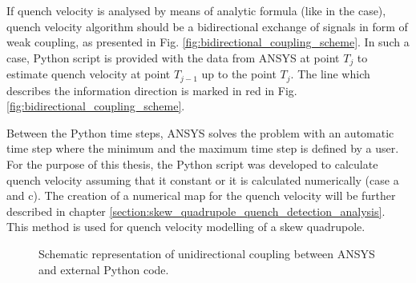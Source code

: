 If quench velocity is analysed by means of analytic formula (like in the  case), quench velocity algorithm should be a bidirectional exchange of signals in form of weak coupling, as presented in Fig. \ref{fig:bidirectional_coupling_scheme}. In such a case, Python script is provided with the data from ANSYS at point $T_j$ to estimate quench velocity at point $T_{j-1}$ up to the point $T_j$. The line which describes the information direction is marked in red in Fig. \ref{fig:bidirectional_coupling_scheme}.

Between the Python time steps, ANSYS solves the problem with an automatic time step where the minimum and the maximum time step is defined by a user. For the purpose of this thesis, the Python script was developed to calculate quench velocity assuming that it constant or it is calculated numerically (case a and c). The creation of a numerical map for the quench velocity will be further described in chapter \ref{section:skew_quadrupole_quench_detection_analysis}. This method is used for quench velocity modelling of a skew quadrupole.

\begin{figure}[H]
\centering
{}
\caption{Schematic representation of unidirectional coupling between ANSYS and external Python code.}
\label{fig:unidirectional_coupling_scheme}
\end{figure}

